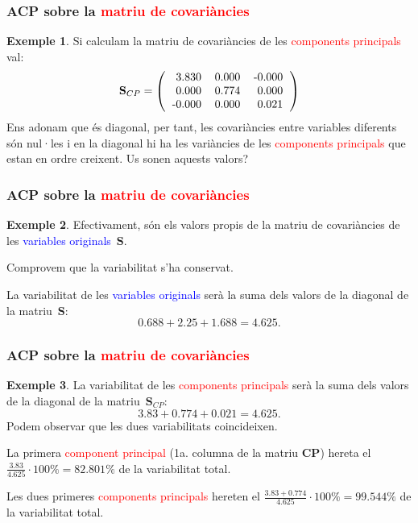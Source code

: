 \documentclass[12pt,t]{beamer}
\newcommand{\red}[1]{\textcolor{red}{#1}}
\newcommand{\blue}[1]{\textcolor{blue}{#1}}
\theoremstyle{plain}
\theoremstyle{definition}
\newtheorem{exemple}{Exemple}
\begin{document}
\begin{frame}
\frametitle{ACP sobre la \red{matriu de covariàncies}}
\begin{exemple}
Si calculam la matriu de covariàncies de les \red{components principals} val:
\[
\mathbf{S}_{CP}=\left(
\begin{tabular}{rrr}
  3.830 & 0.000 & -0.000 \\ 
  0.000 & 0.774 & 0.000 \\ 
  -0.000 & 0.000 & 0.021 \\ 
  \end{tabular}\right)
\]
Ens adonam que és diagonal, per tant, les covariàncies entre variables diferents són nul·les i en la diagonal hi ha les 
variàncies de les \red{components principals} que estan en ordre creixent. Us sonen aquests valors?
\end{exemple}
\end{frame}

\begin{frame}
\frametitle{ACP sobre la \red{matriu de covariàncies}}
\begin{exemple}
Efectivament, són els valors propis de la matriu de covariàncies de les \blue{variables originals}~$\mathbf{S}$.
\bigskip

Comprovem que la variabilitat s'ha conservat. 
\medskip

La variabilitat de les \blue{variables originals} serà la suma dels valors de la diagonal de la matriu~$\mathbf{S}$:
\[
0.688 + 2.25 + 1.688 = 
4.625.
\]
\end{exemple}
\end{frame}


\begin{frame}
\frametitle{ACP sobre la \red{matriu de covariàncies}}
\begin{exemple}
La variabilitat de les \red{components principals} serà la suma dels valors de la diagonal de la 
matriu~$\mathbf{S}_{CP}$:
\[
3.83 + 0.774 + 0.021 = 
4.625.
\]
Podem observar que les dues variabilitats coincideixen.
\medskip

La primera \red{component principal} (1a. columna de la matriu $\mathbf{CP}$) hereta el 
$\frac{3.83}{4.625}\cdot 100\% = 
82.801\%$ de la variabilitat total.

Les dues primeres \red{components principals} hereten el 
$\frac{3.83 + 0.774}{4.625}\cdot 
100\% = 
99.544\%$ de la variabilitat total.
\end{exemple}
\end{frame}
\end{document}
